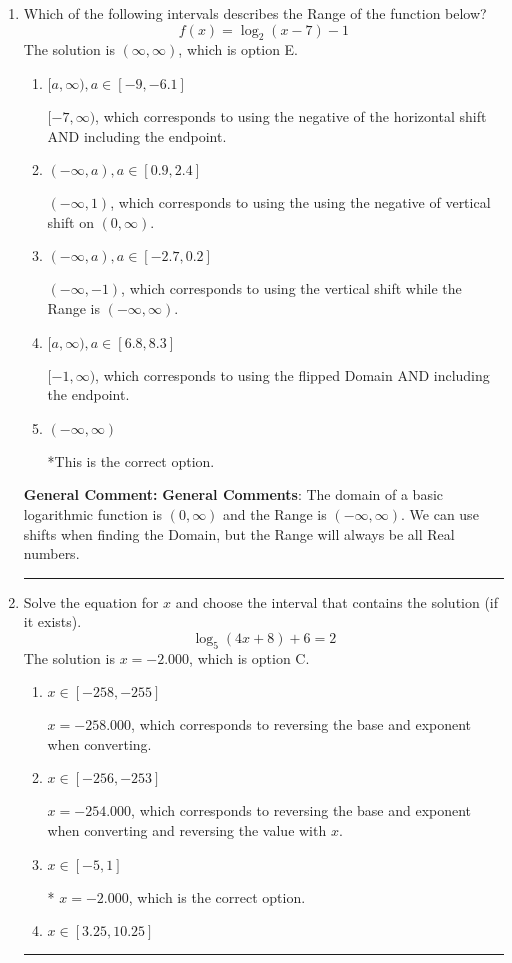\documentclass{extbook}[14pt]
\newcommand{\litem}[1]{\item #1

\rule{\textwidth}{0.4pt}}
\begin{document}
\begin{enumerate}\litem{
Which of the following intervals describes the Range of the function below?
\[ f(x) = \log_2{(x-7)}-1 \]The solution is \( (\infty, \infty) \), which is option E.\begin{enumerate}[label=\Alph*.]
\item \( [a, \infty), a \in [-9, -6.1] \)

$[-7, \infty)$, which corresponds to using the negative of the horizontal shift AND including the endpoint.
\item \( (-\infty, a), a \in [0.9, 2.4] \)

$(-\infty, 1)$, which corresponds to using the using the negative of vertical shift on $(0, \infty)$.
\item \( (-\infty, a), a \in [-2.7, 0.2] \)

$(-\infty, -1)$, which corresponds to using the vertical shift while the Range is $(-\infty, \infty)$.
\item \( [a, \infty), a \in [6.8, 8.3] \)

$[-1, \infty)$, which corresponds to using the flipped Domain AND including the endpoint.
\item \( (-\infty, \infty) \)

*This is the correct option.
\end{enumerate}

\textbf{General Comment:} \textbf{General Comments}: The domain of a basic logarithmic function is $(0, \infty)$ and the Range is $(-\infty, \infty)$. We can use shifts when finding the Domain, but the Range will always be all Real numbers.
}
\litem{
Solve the equation for $x$ and choose the interval that contains the solution (if it exists).
\[ \log_{5}{(4x+8)}+6 = 2 \]The solution is \( x = -2.000 \), which is option C.\begin{enumerate}[label=\Alph*.]
\item \( x \in [-258, -255] \)

$x = -258.000$, which corresponds to reversing the base and exponent when converting.
\item \( x \in [-256, -253] \)

$x = -254.000$, which corresponds to reversing the base and exponent when converting and reversing the value with $x$.
\item \( x \in [-5, 1] \)

* $x = -2.000$, which is the correct option.
\item \( x \in [3.25, 10.25] \)


\end{enumerate}}
\end{enumerate}
\end{document}
